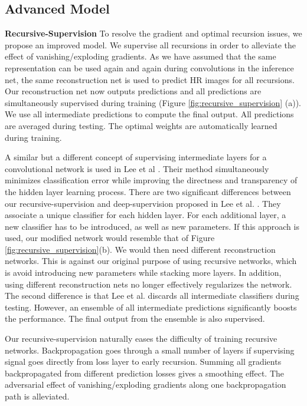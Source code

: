 \documentclass[10pt,twocolumn,letterpaper]{article}
\begin{document}
\subsection{Advanced Model} 
\textbf{Recursive-Supervision} To resolve the gradient and optimal recursion issues, we propose an improved model. We supervise all recursions in order to alleviate the effect of vanishing/exploding gradients. As we have assumed that the same representation can be used again and again during convolutions in the inference net, the same reconstruction net is used to predict HR images for all recursions. Our reconstruction net now outputs  predictions and all predictions are simultaneously supervised during training (Figure \ref{fig:recursive_supervision} (a)). We use all  intermediate predictions to compute the final output. All predictions are averaged during testing. The optimal weights are automatically learned during training. 

A similar but a different concept of supervising intermediate layers for a convolutional network is used in Lee et al  \cite{lee2014deeply}. Their method simultaneously minimizes classification error while improving the directness and transparency of the hidden layer learning process. There are two significant differences between our recursive-supervision and deep-supervision proposed in Lee et al. \cite{lee2014deeply}. They associate a unique classifier for each hidden layer. For each additional layer, a new classifier has to be introduced, as well as new parameters. If this approach is used, our modified network would resemble that of Figure \ref{fig:recursive_supervision}(b). We would then need  different reconstruction networks. This is against our original purpose of using recursive networks, which is avoid introducing new parameters while stacking more layers. In addition, using different reconstruction nets no longer effectively regularizes the network. The second difference is that Lee et al. \cite{lee2014deeply} discards all intermediate classifiers during testing. However, an ensemble of all intermediate predictions significantly boosts the performance. The final output from the ensemble is also supervised.

Our recursive-supervision naturally eases the difficulty of training recursive networks. Backpropagation goes through a small number of layers if supervising signal goes directly from loss layer to early recursion. Summing all gradients backpropagated from different prediction losses gives a smoothing effect. The adversarial effect of vanishing/exploding gradients along one backpropagation path is alleviated.
\end{document}
